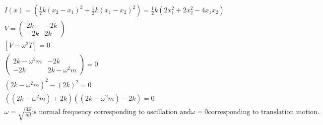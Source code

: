 \begin{enumerate}
\begin{answer}
\begin{align*}
	&I(x)=\left(\frac{1}{2} k\left(x_{2}-x_{1}\right)^{2}+\frac{1}{2} k\left(x_{1}-x_{2}\right)^{2}\right)=\frac{1}{2} k\left(2 x_{1}^{2}+2 x_{2}^{2}-4 x_{1} x_{2}\right)\\
	&V=\left(\begin{array}{cc}
	2 k & -2 k \\
	-2 k & 2 k
	\end{array}\right)\\
	&\left[V-\omega^{2} T\right]=0\\
	&\left(\begin{array}{cc}
	2 k-\omega^{2} m & -2 k \\
	-2 k & 2 k-\omega^{2} m
	\end{array}\right)=0\\
	&\left(2 k-\omega^{2} m\right)^{2}-(2 k)^{2}=0\\
	&\left(\left(2 k-\omega^{2} m\right)+2 k\right)\left(\left(2 k-\omega^{2} m\right)-2 k\right)=0\\
	&\omega=\sqrt{\frac{4 k}{m l}} \text{is normal frequency corresponding to oscillation and} \omega=0 \text{corresponding
		to translation motion.}
	\end{align*}
\end{answer}
\end{enumerate}